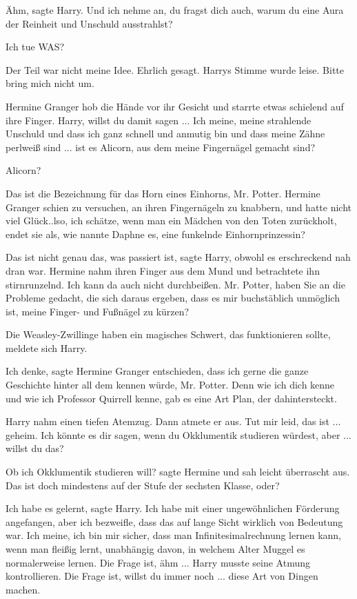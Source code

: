 \glqq{}Ähm\grqq{}, sagte Harry. \glqq{}Und ich nehme an, du fragst dich auch,
warum du eine Aura der Reinheit und Unschuld ausstrahlst?\grqq{}

\glqq{}Ich tue WAS?\grqq{}

\glqq{}Der Teil war nicht meine Idee. Ehrlich gesagt.\grqq{} Harrys Stimme wurde
leise. \glqq{}Bitte bring mich nicht um.\grqq{}

Hermine Granger hob die Hände vor ihr Gesicht und starrte etwas schielend auf
ihre Finger. \glqq{}Harry, willst du damit sagen ... Ich meine, meine strahlende
Unschuld und dass ich ganz schnell und anmutig bin und dass meine Zähne perlweiß
sind ... ist es Alicorn, aus dem meine Fingernägel gemacht sind?\grqq{}

\glqq{}Alicorn?\grqq{}

\glqq{}Das ist die Bezeichnung für das Horn eines Einhorns, Mr. Potter.\grqq{}
Hermine Granger schien zu versuchen, an ihren Fingernägeln zu knabbern, und
hatte nicht viel Glück.\grqq{}.lso, ich schätze, wenn man ein Mädchen von den
Toten zurückholt, endet sie als, wie nannte Daphne es, eine funkelnde
Einhornprinzessin?\grqq{}

\glqq{}Das ist nicht genau das, was passiert ist\grqq{}, sagte Harry, obwohl es
erschreckend nah dran war. Hermine nahm ihren Finger aus dem Mund und
betrachtete ihn stirnrunzelnd. \glqq{}Ich kann da auch nicht durchbeißen. Mr.
Potter, haben Sie an die Probleme gedacht, die sich daraus ergeben, dass es mir
buchstäblich unmöglich ist, meine Finger- und Fußnägel zu kürzen?\grqq{}

\glqq{}Die Weasley-Zwillinge haben ein magisches Schwert, das funktionieren
sollte\grqq{}, meldete sich Harry.

\glqq{}Ich denke\grqq{}, sagte Hermine Granger entschieden, \glqq{}dass ich gerne
die ganze Geschichte hinter all dem kennen würde, Mr. Potter. Denn wie ich dich
kenne und wie ich Professor Quirrell kenne, gab es eine Art Plan, der
dahintersteckt.\grqq{}

Harry nahm einen tiefen Atemzug. Dann atmete er aus. \glqq{}Tut mir leid, das
ist ... geheim. Ich könnte es dir sagen, wenn du Okklumentik studieren würdest,
aber ... willst du das?\grqq{}

\glqq{}Ob ich Okklumentik studieren will?\grqq{} sagte Hermine und sah leicht
überrascht aus. \glqq{}Das ist doch mindestens auf der Stufe der sechsten Klasse,
oder?\grqq{}

\glqq{}Ich habe es gelernt\grqq{}, sagte Harry. \glqq{}Ich habe mit einer
ungewöhnlichen Förderung angefangen, aber ich bezweifle, dass das auf lange
Sicht wirklich von Bedeutung war. Ich meine, ich bin mir sicher, dass man
Infinitesimalrechnung lernen kann, wenn man fleißig lernt, unabhängig davon, in
welchem Alter Muggel es normalerweise lernen. Die Frage ist, ähm ...\grqq{} Harry
musste seine Atmung kontrollieren. \glqq{}Die Frage ist, willst du immer noch ...
diese Art von Dingen machen.\grqq{}

